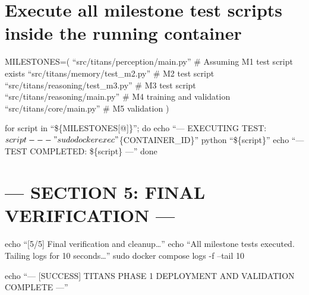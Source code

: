 \documentclass[letterpaper,twocolumn]{article}
\begin{document}
\hypertarget{execute-all-milestone-test-scripts-inside-the-running-container}{%
\section{Execute all milestone test scripts inside the running
container}\label{execute-all-milestone-test-scripts-inside-the-running-container}}

MILESTONES=( ``src/titans/perception/main.py'' \# Assuming M1 test
script exists ``src/titans/memory/test\_m2.py'' \# M2 test script
``src/titans/reasoning/test\_m3.py'' \# M3 test script
``src/titans/reasoning/main.py'' \# M4 training and validation
``src/titans/core/main.py'' \# M5 validation )

for script in ``\$\{MILESTONES{[}@{]}\}''; do echo ``--- EXECUTING TEST:
\({script} ---"  sudo docker exec "\)\{CONTAINER\_ID\}'' python
``\$\{script\}'' echo ``--- TEST COMPLETED: \$\{script\} ---'' done

\hypertarget{section-5-final-verification}{%
\section{--- SECTION 5: FINAL VERIFICATION
---}\label{section-5-final-verification}}

echo ``{[}5/5{]} Final verification and cleanup\ldots{}'' echo ``All
milestone tests executed. Tailing logs for 10 seconds\ldots{}'' sudo
docker compose logs -f --tail 10

echo ``--- {[}SUCCESS{]} TITANS PHASE 1 DEPLOYMENT AND VALIDATION
COMPLETE ---''
\end{document}
